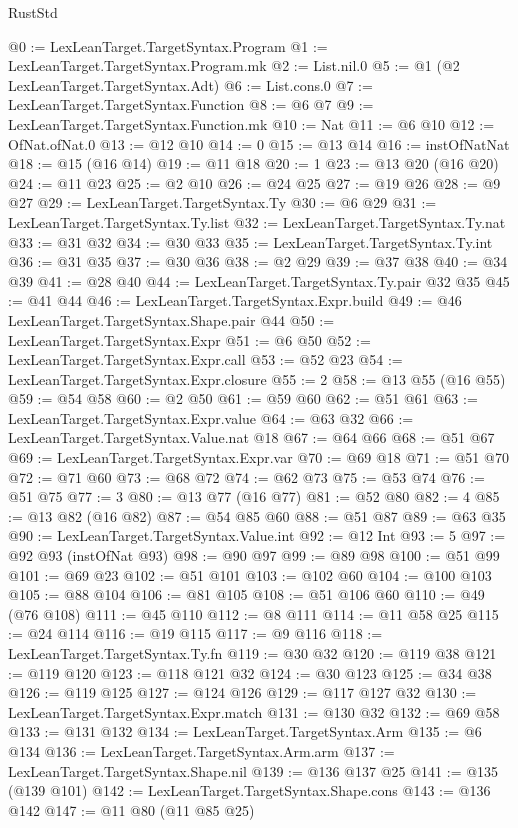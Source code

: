 \begin{lexlean}{RustStd}
\begin{coremodule}
@0 := LexLeanTarget.TargetSyntax.Program
@1 := LexLeanTarget.TargetSyntax.Program.mk
@2 := List.nil.{0}
@5 := @1 (@2 LexLeanTarget.TargetSyntax.Adt)
@6 := List.cons.{0}
@7 := LexLeanTarget.TargetSyntax.Function
@8 := @6 @7
@9 := LexLeanTarget.TargetSyntax.Function.mk
@10 := Nat
@11 := @6 @10
@12 := OfNat.ofNat.{0}
@13 := @12 @10
@14 := 0
@15 := @13 @14
@16 := instOfNatNat
@18 := @15 (@16 @14)
@19 := @11 @18
@20 := 1
@23 := @13 @20 (@16 @20)
@24 := @11 @23
@25 := @2 @10
@26 := @24 @25
@27 := @19 @26
@28 := @9 @27
@29 := LexLeanTarget.TargetSyntax.Ty
@30 := @6 @29
@31 := LexLeanTarget.TargetSyntax.Ty.list
@32 := LexLeanTarget.TargetSyntax.Ty.nat
@33 := @31 @32
@34 := @30 @33
@35 := LexLeanTarget.TargetSyntax.Ty.int
@36 := @31 @35
@37 := @30 @36
@38 := @2 @29
@39 := @37 @38
@40 := @34 @39
@41 := @28 @40
@44 := LexLeanTarget.TargetSyntax.Ty.pair @32 @35
@45 := @41 @44
@46 := LexLeanTarget.TargetSyntax.Expr.build
@49 := @46 LexLeanTarget.TargetSyntax.Shape.pair @44
@50 := LexLeanTarget.TargetSyntax.Expr
@51 := @6 @50
@52 := LexLeanTarget.TargetSyntax.Expr.call
@53 := @52 @23
@54 := LexLeanTarget.TargetSyntax.Expr.closure
@55 := 2
@58 := @13 @55 (@16 @55)
@59 := @54 @58
@60 := @2 @50
@61 := @59 @60
@62 := @51 @61
@63 := LexLeanTarget.TargetSyntax.Expr.value
@64 := @63 @32
@66 := LexLeanTarget.TargetSyntax.Value.nat @18
@67 := @64 @66
@68 := @51 @67
@69 := LexLeanTarget.TargetSyntax.Expr.var
@70 := @69 @18
@71 := @51 @70
@72 := @71 @60
@73 := @68 @72
@74 := @62 @73
@75 := @53 @74
@76 := @51 @75
@77 := 3
@80 := @13 @77 (@16 @77)
@81 := @52 @80
@82 := 4
@85 := @13 @82 (@16 @82)
@87 := @54 @85 @60
@88 := @51 @87
@89 := @63 @35
@90 := LexLeanTarget.TargetSyntax.Value.int
@92 := @12 Int
@93 := 5
@97 := @92 @93 (instOfNat @93)
@98 := @90 @97
@99 := @89 @98
@100 := @51 @99
@101 := @69 @23
@102 := @51 @101
@103 := @102 @60
@104 := @100 @103
@105 := @88 @104
@106 := @81 @105
@108 := @51 @106 @60
@110 := @49 (@76 @108)
@111 := @45 @110
@112 := @8 @111
@114 := @11 @58 @25
@115 := @24 @114
@116 := @19 @115
@117 := @9 @116
@118 := LexLeanTarget.TargetSyntax.Ty.fn
@119 := @30 @32
@120 := @119 @38
@121 := @119 @120
@123 := @118 @121 @32
@124 := @30 @123
@125 := @34 @38
@126 := @119 @125
@127 := @124 @126
@129 := @117 @127 @32
@130 := LexLeanTarget.TargetSyntax.Expr.match
@131 := @130 @32
@132 := @69 @58
@133 := @131 @132
@134 := LexLeanTarget.TargetSyntax.Arm
@135 := @6 @134
@136 := LexLeanTarget.TargetSyntax.Arm.arm
@137 := LexLeanTarget.TargetSyntax.Shape.nil
@139 := @136 @137 @25
@141 := @135 (@139 @101)
@142 := LexLeanTarget.TargetSyntax.Shape.cons
@143 := @136 @142
@147 := @11 @80 (@11 @85 @25)

\end{coremodule}
\end{lexlean}
